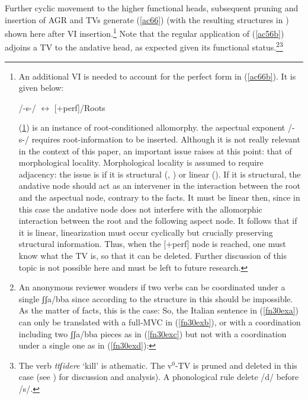 \documentclass[output=paper]{langscibook}
\begin{document}
Further cyclic movement to the higher functional heads, subsequent pruning and insertion of AGR and TVs generate (\ref{ac66}) (with the resulting structures in ) shown here after VI insertion.\footnote{An additional VI is needed to account for the perfect form in (\ref{ac66b}).  It is given below:

\ea \label{fn29ex} /-s-/ $\longleftrightarrow$ [+perf]/Roots \underline{\hspace{2em}}
\z

(\ref{fn29ex}) is an instance of root-conditioned allomorphy. the aspectual exponent /-s-/ requires root-information to be inserted. Although it is not really relevant in the context of this paper, an important issue raises at this point: that of morphological locality.  Morphological locality is assumed to require adjacency: the issue is if it is structural (\cite{bobaljik2012a}, \cite{calabrese2019a}) or linear (\cite{embick2010a}).  If it is structural, the andative node should act as an intervener in the interaction between the root and the aspectual node, contrary to the facts. It must be linear then, since in this case the andative node does not interfere with the allomorphic interaction between the root and the following aspect node. It follows that if it is linear, linearization must occur cyclically but crucially preserving structural information. Thus, when the [+perf] node is reached, one must know what the TV is, so that it can be deleted. Further discussion of this topic is not possible here and must be left to future research.} Note that the regular application of (\ref{ac56b}) adjoins a TV to the andative head, as expected given its functional status.\footnote{An anonymous reviewer wonders if two verbs can be coordinated under a single ʃʃa/bba since according to the structure in  this should be impossible. As the matter of facts, this is the case: So, the Italian sentence in (\ref{fn30exa}) can only be translated with a full-MVC in (\ref{fn30exb}), or with a coordination including two ʃʃa/bba pieces as in (\ref{fn30exc}) but not with a coordination under a single one as in (\ref{fn30exd}):

\z
}\footnote{The verb \textit{ttʃidere} ‘kill’ is athematic. The v$^0$-TV is pruned and deleted in this case (see \cite{calabrese2015a, calabrese2019a}) for discussion and analysis).  A phonological rule delete /d/ before /s/.
}
\end{document}
